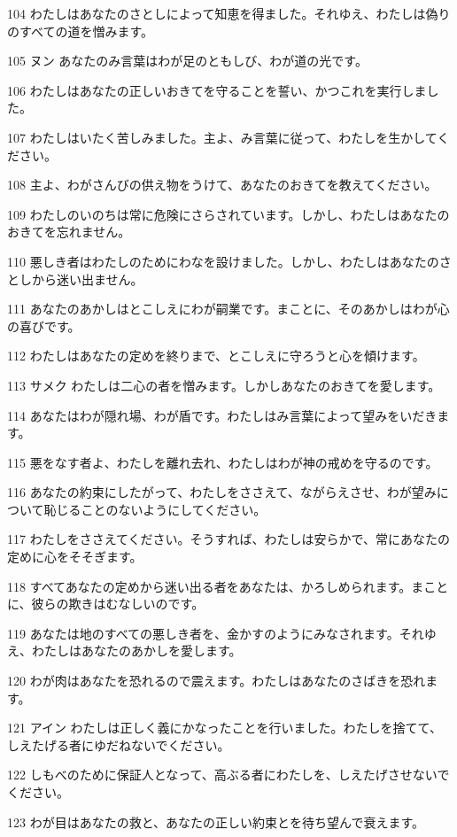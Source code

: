 \par 104 わたしはあなたのさとしによって知恵を得ました。それゆえ、わたしは偽りのすべての道を憎みます。
\par 105 ヌン あなたのみ言葉はわが足のともしび、わが道の光です。
\par 106 わたしはあなたの正しいおきてを守ることを誓い、かつこれを実行しました。
\par 107 わたしはいたく苦しみました。主よ、み言葉に従って、わたしを生かしてください。
\par 108 主よ、わがさんびの供え物をうけて、あなたのおきてを教えてください。
\par 109 わたしのいのちは常に危険にさらされています。しかし、わたしはあなたのおきてを忘れません。
\par 110 悪しき者はわたしのためにわなを設けました。しかし、わたしはあなたのさとしから迷い出ません。
\par 111 あなたのあかしはとこしえにわが嗣業です。まことに、そのあかしはわが心の喜びです。
\par 112 わたしはあなたの定めを終りまで、とこしえに守ろうと心を傾けます。
\par 113 サメク わたしは二心の者を憎みます。しかしあなたのおきてを愛します。
\par 114 あなたはわが隠れ場、わが盾です。わたしはみ言葉によって望みをいだきます。
\par 115 悪をなす者よ、わたしを離れ去れ、わたしはわが神の戒めを守るのです。
\par 116 あなたの約束にしたがって、わたしをささえて、ながらえさせ、わが望みについて恥じることのないようにしてください。
\par 117 わたしをささえてください。そうすれば、わたしは安らかで、常にあなたの定めに心をそそぎます。
\par 118 すべてあなたの定めから迷い出る者をあなたは、かろしめられます。まことに、彼らの欺きはむなしいのです。
\par 119 あなたは地のすべての悪しき者を、金かすのようにみなされます。それゆえ、わたしはあなたのあかしを愛します。
\par 120 わが肉はあなたを恐れるので震えます。わたしはあなたのさばきを恐れます。
\par 121 アイン わたしは正しく義にかなったことを行いました。わたしを捨てて、しえたげる者にゆだねないでください。
\par 122 しもべのために保証人となって、高ぶる者にわたしを、しえたげさせないでください。
\par 123 わが目はあなたの救と、あなたの正しい約束とを待ち望んで衰えます。

